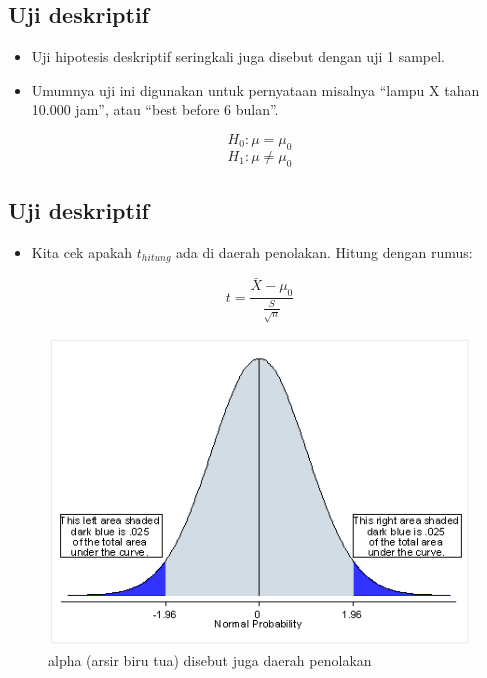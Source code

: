 \documentclass[
  letterpaper,
  DIV=11,
  numbers=noendperiod]{scrartcl}
\providecommand{\tightlist}{%
  \setlength{\itemsep}{0pt}\setlength{\parskip}{0pt}}\usepackage{longtable,booktabs,array}
\begin{document}
\hypertarget{uji-deskriptif}{%
\subsection{Uji deskriptif}\label{uji-deskriptif}}

\begin{itemize}
\item
  Uji hipotesis deskriptif seringkali juga disebut dengan uji 1 sampel.
\item
  Umumnya uji ini digunakan untuk pernyataan misalnya ``lampu X tahan
  10.000 jam'', atau ``best before 6 bulan''.
\end{itemize}

\[
H_0: \mu = \mu_0
\] \[
H_1: \mu \neq \mu_0
\]

\hypertarget{uji-deskriptif-1}{%
\subsection{Uji deskriptif}\label{uji-deskriptif-1}}

\begin{itemize}
\tightlist
\item
  Kita cek apakah \(t_{hitung}\) ada di daerah penolakan. Hitung dengan
  rumus:
\end{itemize}

\[
t=\frac{\bar{X}-\mu_0}{\frac{S}{\sqrt{n}}}
\]

\begin{figure}

{\centering \includegraphics{pvalue1.gif}

}

\caption{alpha (arsir biru tua) disebut juga daerah penolakan}

\end{figure}
\end{document}
